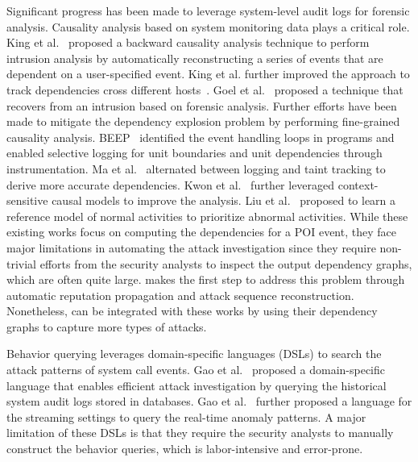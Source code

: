 Significant progress has been made to leverage system-level audit logs for
forensic analysis.
%
Causality analysis based on system monitoring data plays a critical role.
King et al.~\cite{backtracking} proposed a backward causality analysis
technique to perform intrusion analysis by 
automatically reconstructing a series of events that are dependent on a user-specified event.
King et al. further improved the approach to track dependencies cross different hosts~\cite{backtracking2}.
Goel et al.~\cite{taser} proposed a technique that recovers from an intrusion
based on forensic analysis.
%
Further efforts have been made to mitigate the dependency explosion problem by performing fine-grained causality analysis. BEEP~\cite{beep} identified the event handling loops in programs and enabled selective logging for unit boundaries and unit dependencies through instrumentation. Ma et al.~\cite{ma2016protracer} alternated between logging and taint tracking to derive more accurate dependencies.
Kwon et al.~\cite{mcitracking} further leveraged context-sensitive causal models to improve the analysis.
Liu et al.~\cite{liu2018priotracker} proposed to learn a reference model of normal activities to prioritize abnormal activities.
%
%
%
While these existing works focus on computing the dependencies for a POI event,
they face major limitations in automating the attack investigation since they require non-trivial efforts from the security analysts to inspect the output dependency graphs, which are often quite large.
\tool makes the first step to address this problem through automatic reputation propagation and attack sequence reconstruction. 
Nonetheless, \tool can be integrated with these works by using their dependency graphs to capture more types of attacks.

Behavior querying leverages domain-specific languages (DSLs) to search the attack patterns of system call events.
Gao et al.~\cite{gao2018aiql} proposed a domain-specific language that enables efficient attack investigation by querying the historical system audit logs stored in databases.
Gao et al.~\cite{gao2018saql} further proposed a language for the streaming settings to query the real-time anomaly patterns.
A major limitation of these DSLs is that they require the security analysts to manually construct the behavior queries, which is labor-intensive and error-prone.


